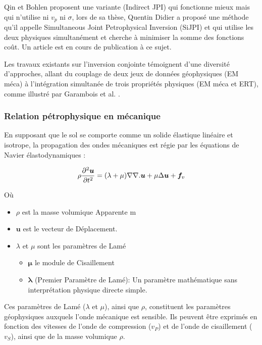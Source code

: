 Qin et Bohlen \cite{Qin_Bohlen} proposent une variante (Indirect JPI) qui fonctionne mieux mais qui n'utilise ni $v_p$ ni $\sigma$, lors de sa thèse, Quentin Didier a proposé une méthode qu'il appelle Simultaneous Joint Petrophysical Inversion (SiJPI) \cite{didie2024} et qui utilise les deux physiques simultanément et cherche à minimiser la somme des fonctions coût. Un article est en cours de publication à ce sujet. \par

Les travaux existants sur l'inversion conjointe témoignent d'une diversité d'approches, allant du couplage de deux jeux de données géophysiques (EM méca) \cite{Abubakar_2012} à l'intégration simultanée de trois propriétés physiques (EM méca et ERT), comme illustré par Garambois et al. \cite{GARAMBOIS2002}.

\subsubsection{Relation pétrophysique en mécanique}

En supposant que le sol se comporte comme un solide élastique linéaire et isotrope, la propagation des ondes mécaniques est régie par les équations de Navier élastodynamiques :

\begin{equation}
    \rho \pderive[2]{\ubm}{t} = (\lambda+\mu) \nabla\nabla.\ubm + \mu \Delta \ubm + \fbm_v
\end{equation}

Où
\begin{itemize}
    \item $\rho$ est la masse volumique Apparente m
    \item $\mathbf{u}$ est le vecteur de Déplacement.
    \item $\lambda$ et $\mu$ sont les paramètres de Lamé 
    \begin{itemize}
        \item $\mathbf{\mu}$ le module de Cisaillement
        \item $\mathbf{\lambda}$ (Premier Paramètre de Lamé): Un paramètre mathématique sans interprétation physique directe simple.
    \end{itemize}
\end{itemize}

Ces paramètres de Lamé ($\lambda$ et $\mu$), ainsi que $\rho$, constituent les paramètres géophysiques auxquels l'onde mécanique est sensible. Ils peuvent être exprimés en fonction des vitesses de l'onde de compression ($v_P$) et de l'onde de cisaillement ($v_S$), ainsi que de la masse volumique $\rho$.

